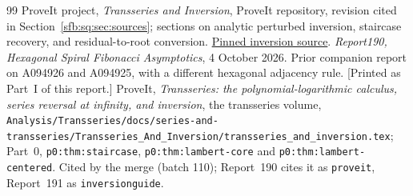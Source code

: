 \documentclass[11pt]{article}
\theoremstyle{remark}\newtheorem{remark}[theorem]{Remark}
\newcommand{\file}[1]{\nolinkurl{#1}}
\begin{document}
\begin{thebibliography}{99}
 ProveIt project, \emph{Transseries and Inversion}, ProveIt repository, revision cited in Section~\ref{sfb:sq:sec:sources}; sections on analytic perturbed inversion, staircase recovery, and residual-to-root conversion. \href{https://github.com/VladimirReshetnikov/ProveIt/blob/9ba11eaf7c1b6a27ccfc0bab63e22f97768cb704/Analysis/Transseries/docs/series-and-transseries/Transseries_And_Inversion/transseries_and_inversion.tex}{Pinned inversion source}.
 \emph{Report190, Hexagonal Spiral Fibonacci Asymptotics}, 4 October 2026. Prior companion report on A094926 and A094925, with a different hexagonal adjacency rule. [Printed as Part~I of this report.]
 ProveIt, \emph{Transseries: the polynomial-logarithmic calculus, series reversal at infinity, and inversion}, the transseries volume, \file{Analysis/Transseries/docs/series-and-transseries/Transseries_And_Inversion/transseries_and_inversion.tex}; Part~0, \file{p0:thm:staircase}, \file{p0:thm:lambert-core} and \file{p0:thm:lambert-centered}. Cited by the merge (batch 110); Report~190 cites it as \texttt{proveit}, Report~191 as \texttt{inversionguide}.
\end{thebibliography}
\end{document}
